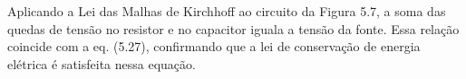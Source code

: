 Aplicando a Lei das Malhas de Kirchhoff ao circuito da Figura 5.7, a soma das quedas de tensão no resistor e no capacitor iguala a tensão da fonte. Essa relação coincide com a eq. (5.27), confirmando que a lei de conservação de energia elétrica é satisfeita nessa equação. 
